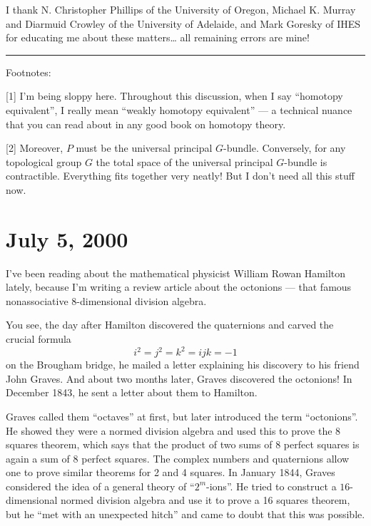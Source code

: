 \documentclass{article}
\begin{document}
I thank N. Christopher Phillips of the University of Oregon, Michael K.
Murray and Diarmuid Crowley of the University of Adelaide, and Mark
Goresky of IHES for educating me about these matters\ldots{} all
remaining errors are mine!

\begin{center}\rule{0.5\linewidth}{0.5pt}\end{center}

Footnotes:

{[}1{]} I'm being sloppy here. Throughout this discussion, when I say
``homotopy equivalent'', I really mean ``weakly homotopy equivalent''
--- a technical nuance that you can read about in any good book on
homotopy theory.

{[}2{]} Moreover, \(P\) must be the universal principal \(G\)-bundle.
Conversely, for any topological group \(G\) the total space of the
universal principal \(G\)-bundle is contractible. Everything fits
together very neatly! But I don't need all this stuff now.



\hypertarget{week152}{%
\section{July 5, 2000}\label{week152}}

I've been reading about the mathematical physicist William Rowan
Hamilton lately, because I'm writing a review article about the
octonions --- that famous nonassociative \(8\)-dimensional division
algebra.

You see, the day after Hamilton discovered the quaternions and carved
the crucial formula \[i^2=j^2=k^2=ijk=-1\] on the Brougham bridge, he
mailed a letter explaining his discovery to his friend John Graves. And
about two months later, Graves discovered the octonions! In December
1843, he sent a letter about them to Hamilton.

Graves called them ``octaves'' at first, but later introduced the term
``octonions''. He showed they were a normed division algebra and used
this to prove the 8 squares theorem, which says that the product of two
sums of 8 perfect squares is again a sum of 8 perfect squares. The
complex numbers and quaternions allow one to prove similar theorems for
2 and 4 squares. In January 1844, Graves considered the idea of a
general theory of ``\(2^m\)-ions''. He tried to construct a
\(16\)-dimensional normed division algebra and use it to prove a 16
squares theorem, but he ``met with an unexpected hitch'' and came to
doubt that this was possible.
\end{document}
